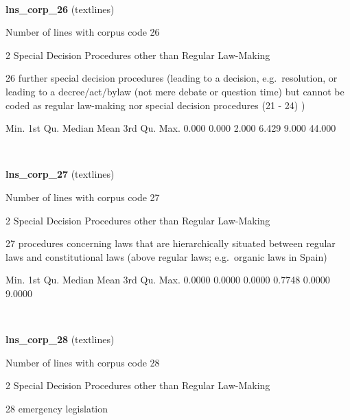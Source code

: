 \documentclass[]{article}
\newenvironment{Shaded}{\begin{snugshade}}{\end{snugshade}}
\newcommand{\FloatTok}[1]{\textcolor[rgb]{0.00,0.00,0.81}{{#1}}}
\newcommand{\NormalTok}[1]{{#1}}
\begin{document}
~

\vspace{1em}

\textbf{lns\_corp\_26} (textlines)

Number of lines with corpus code 26

2 Special Decision Procedures other than Regular Law-Making

26 further special decision procedures (leading to a decision,
e.g.~resolution, or leading to a decree/act/bylaw (not mere debate or
question time) but cannot be coded as regular law-making nor special
decision procedures (21 - 24) )

\begin{Shaded}
\begin{Highlighting}[]
   \NormalTok{Min. 1st Qu.  Median    Mean 3rd Qu.    Max. }
  \FloatTok{0.000}   \FloatTok{0.000}   \FloatTok{2.000}   \FloatTok{6.429}   \FloatTok{9.000}  \FloatTok{44.000} 
\end{Highlighting}
\end{Shaded}

~

\vspace{1em}

\textbf{lns\_corp\_27} (textlines)

Number of lines with corpus code 27

2 Special Decision Procedures other than Regular Law-Making

27 procedures concerning laws that are hierarchically situated between
regular laws and constitutional laws (above regular laws; e.g.~organic
laws in Spain)

\begin{Shaded}
\begin{Highlighting}[]
   \NormalTok{Min. 1st Qu.  Median    Mean 3rd Qu.    Max. }
 \FloatTok{0.0000}  \FloatTok{0.0000}  \FloatTok{0.0000}  \FloatTok{0.7748}  \FloatTok{0.0000}  \FloatTok{9.0000} 
\end{Highlighting}
\end{Shaded}

~

\vspace{1em}

\textbf{lns\_corp\_28} (textlines)

Number of lines with corpus code 28

2 Special Decision Procedures other than Regular Law-Making

28 emergency legislation
\end{document}
